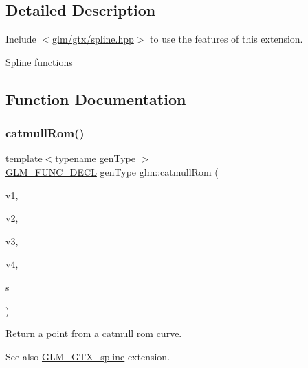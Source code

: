 \subsection{Detailed Description}
Include $<$\mbox{\hyperlink{spline_8hpp}{glm/gtx/spline.\+hpp}}$>$ to use the features of this extension.

Spline functions 

\subsection{Function Documentation}
\mbox{\label{group__gtx__spline_ga8119c04f8210fd0d292757565cd6918d}} 
\subsubsection{\texorpdfstring{catmull\+Rom()}{catmullRom()}}
{\footnotesize\ttfamily template$<$typename gen\+Type $>$ \\
\mbox{\hyperlink{setup_8hpp_ab2d052de21a70539923e9bcbf6e83a51}{G\+L\+M\+\_\+\+F\+U\+N\+C\+\_\+\+D\+E\+CL}} gen\+Type glm\+::catmull\+Rom (\begin{DoxyParamCaption}\item[{gen\+Type const \&}]{v1,  }\item[{gen\+Type const \&}]{v2,  }\item[{gen\+Type const \&}]{v3,  }\item[{gen\+Type const \&}]{v4,  }\item[{typename gen\+Type\+::value\+\_\+type const \&}]{s }\end{DoxyParamCaption})}

Return a point from a catmull rom curve. \begin{DoxySeeAlso}{See also}
\mbox{\hyperlink{group__gtx__spline}{G\+L\+M\+\_\+\+G\+T\+X\+\_\+spline}} extension. 
\end{DoxySeeAlso}
\mbox{\label{group__gtx__spline_ga6b867eb52e2fc933d2e0bf26aabc9a70}} 
